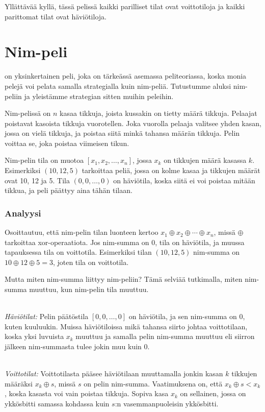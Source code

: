 Yllättävää kyllä, tässä pelissä kaikki
parilliset tilat ovat voittotiloja ja
kaikki parittomat tilat ovat häviötiloja.

\section{Nim-peli}


 on yksinkertainen peli,
joka on tärkeässä asemassa peliteoriassa,
koska monia pelejä voi pelata samalla
strategialla kuin nim-peliä.
Tutustumme aluksi nim-peliin ja yleistämme
strategian sitten muihin peleihin.

Nim-pelissä on $n$ kasaa tikkuja,
joista kussakin on tietty määrä tikkuja.
Pelaajat poistavat kasoista tikkuja vuorotellen.
Joka vuorolla pelaaja valitsee yhden kasan,
jossa on vielä tikkuja,
ja poistaa siitä minkä tahansa määrän tikkuja.
Pelin voittaa se, joka poistaa viimeisen tikun.

Nim-pelin tila on muotoa $[x_1,x_2,\ldots,x_n]$,
jossa $x_k$ on tikkujen määrä kasassa $k$.
Esimerkiksi $(10,12,5)$ tarkoittaa peliä,
jossa on kolme kasaa ja tikkujen määrät ovat 10, 12 ja 5.
Tila $(0,0,\ldots,0)$ on häviötila,
koska siitä ei voi poistaa mitään tikkua,
ja peli päättyy aina tähän tilaan.

\subsubsection{Analyysi}
Osoittautuu, että nim-pelin tilan luonteen
kertoo  $x_1 \oplus x_2 \oplus \cdots \oplus x_n$,
missä $\oplus$ tarkoittaa xor-operaatiota.
Jos nim-summa on 0, tila on häviötila,
ja muussa tapauksessa tila on voittotila.
Esimerkiksi tilan $(10,12,5)$ nim-summa on
$10 \oplus 12 \oplus 5 = 3$, joten tila on voittotila.

Mutta miten nim-summa liittyy nim-peliin?
Tämä selviää tutkimalla, miten nim-summa muuttuu,
kun nim-pelin tila muuttuu.

~\\
\noindent
\textit{Häviötilat:}
Pelin päätöstila $[0,0,\ldots,0]$ on häviötila,
ja sen nim-summa on 0, kuten kuuluukin.
Muissa häviötiloissa mikä tahansa siirto johtaa
voittotilaan, koska yksi luvuista $x_k$ muuttuu
ja samalla pelin nim-summa muuttuu
eli siirron jälkeen nim-summasta tulee jokin muu kuin 0.

~\\
\noindent
\textit{Voittotilat:}
Voittotilasta pääsee häviötilaan muuttamalla
jonkin kasan $k$ tikkujen määräksi $x_k \oplus s$,
missä $s$ on pelin nim-summa.
Vaatimuksena on, että $x_k \oplus s < x_k$,
koska kasasta voi vain poistaa tikkuja.
Sopiva kasa $x_k$ on sellainen,
jossa on ykkösbitti samassa kohdassa kuin
$s$:n vasemmanpuoleisin ykkösbitti.


